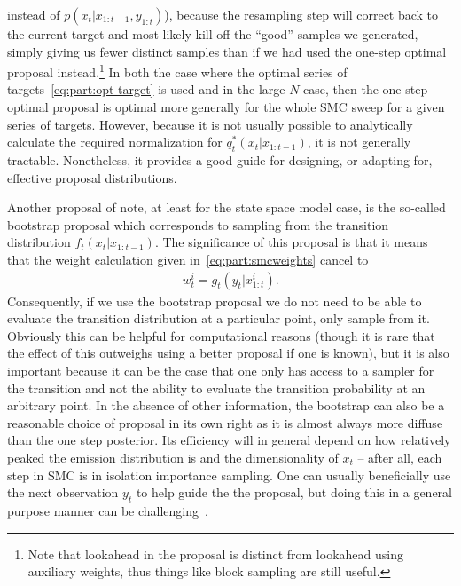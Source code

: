 instead of $p(x_{t} |x_{1:t-1},y_{1:t})$), because the resampling step will correct back to the current target and
most likely kill off the ``good'' samples we generated, simply giving us fewer distinct samples than if we had
used the one-step optimal proposal instead.\footnote{Note that lookahead in the proposal is distinct from
	lookahead using auxiliary weights, thus things like block sampling are still useful.}
In both the case where the optimal series of targets~\eqref{eq:part:opt-target} is used and in the large $N$ case, then
the one-step optimal proposal is optimal more generally for the whole SMC sweep for a given series of targets.  However, because it is
not usually possible to analytically calculate the required normalization for $q_t^*(x_t | x_{1:t-1})$, it is
not generally tractable.  Nonetheless, it provides a good guide for designing, or adapting for, effective proposal
distributions.

Another proposal of note, at least for the state space model case, is the so-called bootstrap proposal which
corresponds to sampling from the transition distribution $f_t(x_t | x_{1:t-1})$.  The significance of this proposal
is that it means that the weight calculation given in~\eqref{eq:part:smcweights} cancel to
\begin{align}
\label{eq:part:bootstrap-weights}
w_t^i = g_t (y_t | x_{1:t}^i).
\end{align}
Consequently, if we use the bootstrap proposal we do not need to be able to evaluate the transition distribution
at a particular point, only sample from it.  Obviously this can be helpful for computational reasons (though
it is rare that the effect of this outweighs using a better proposal if one is known), but it is also important
because it can be the case that one only has access to a sampler for the transition and not the ability to evaluate
the transition probability at an arbitrary point.
In the absence of other information, the bootstrap can also be a reasonable choice of proposal in its own right as
it is almost always more diffuse than the one step posterior.  Its efficiency will in general depend on how relatively
peaked the emission distribution is and the dimensionality of $x_t$ -- after all, each step in SMC is in
isolation importance sampling.  One can usually beneficially use the next observation $y_t$ to help guide the
the proposal, but doing this in a general purpose manner can be challenging~\citep{gu2015neural}.